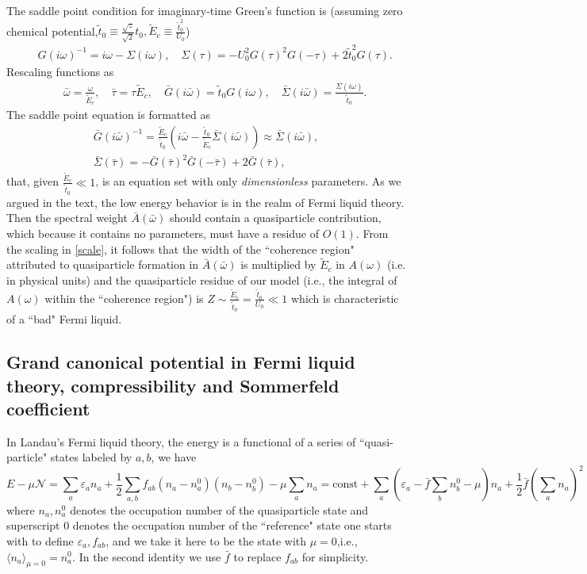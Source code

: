 \documentclass[twocolumn,floatfix,superscriptaddress]{revtex4-1}
\newcommand{\ket}{\rangle}
\newcommand{\bra}{\langle}
\begin{document}
\begin{widetext}
The saddle point condition for imaginary-time Green's function is (assuming zero chemical potential,$\tilde t_0\equiv \frac{\sqrt z}{\sqrt 2} t_0,\tilde E_c\equiv \frac{\tilde t_0^2}{U_0}$)
 \begin{eqnarray}
&&G(i\omega)^{-1}=i\omega-\Sigma(i\omega),\quad \Sigma(\tau)=-U_0^2G(\tau)^2G(-\tau)+2\tilde t_0^2G(\tau).
 \end{eqnarray}
 Rescaling functions as
 \begin{eqnarray}
 \label{scale}
 &&\bar \omega=\frac{\omega}{\tilde E_c},\quad\bar \tau=\tau \tilde E_c,\quad \bar G(i\bar\omega)=\tilde t_0G(i\omega),\quad \bar \Sigma(i\bar\omega)=\frac{\Sigma(i\omega)}{\tilde t_0}.
 \end{eqnarray}
 The saddle point equation is formatted as
 \begin{eqnarray}
 \label{scaled}
 \bar G(i\bar\omega)^{-1}=\frac{\tilde E_c}{\tilde t_0}(i\bar\omega-\frac{\tilde t_0}{\tilde E_c}\bar \Sigma(i\bar\omega))\approx \bar \Sigma(i\bar\omega),\nonumber\\
 \bar\Sigma(\bar \tau)=-\bar G(\bar\tau)^2\bar G(-\bar\tau)+2\bar G(\bar\tau),
 \end{eqnarray}
 that, given $\frac{\tilde E_c}{\tilde t_0}\ll 1$, is an equation set
 with only \emph{dimensionless} parameters.  As we argued in the text,
 the low energy behavior is in the realm of Fermi liquid theory.  Then
 the spectral weight $\bar A(\bar \omega)$ 
 should contain a
 quasiparticle contribution, which because it contains no parameters,
 must have a  residue of $O(1)$. From the scaling in \eqref{scale},
 it follows that the width of the ``coherence region" attributed to
 quasiparticle formation in $\bar A(\bar\omega)$ is multiplied by
 $\tilde E_c$ in $A(\omega)$ (i.e. in physical units) and the quasiparticle residue of our
 model (i.e., the integral of $A(\omega)$ within the ``coherence
 region") is
 $Z\sim\frac{\tilde E_c}{\tilde t_0}=\frac{\tilde t_0}{U_0}\ll 1$
 which is characteristic of a ``bad" Fermi
 liquid.%
 
 \subsection{Grand canonical potential in Fermi liquid theory, compressibility and Sommerfeld coefficient}
In Landau's Fermi liquid theory, the energy is a functional of a series of ``quasi-particle" states labeled by $a,b$, we have
\begin{equation}
E-\mu\mathcal N=\sum_a \varepsilon_a n_a+\frac{1}{2}\sum_{a,b}f_{ab}(n_a-n_a^0)(n_b-n_b^0)-\mu \sum_a n_a=\text{const}+\sum_a (\varepsilon_a-\bar f\sum_b n_b^0-\mu)n_a+\frac{1}{2}\bar f(\sum_a n_a)^2
\end{equation}
where $n_a,n_a^0$ denotes the occupation number of the quasiparticle state and superscript $0$ denotes the occupation number of the ``reference" state one starts with to define $\varepsilon_a, f_{ab}$, and we take it here to be the state with $\mu=0$,i.e., $\bra n_a\ket_{\mu=0}=n_a^0$. In the second identity we use $\bar f$ to replace $f_{ab}$ for simplicity.


\end{widetext}
\end{document}
